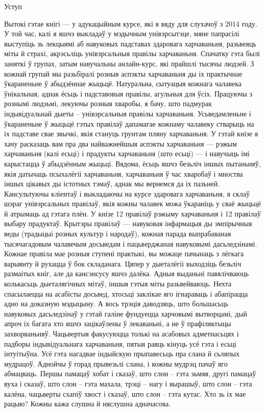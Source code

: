 Уступ

Вытокі гэтае кнігі — у адукацыйным курсе, які я вяду для слухачоў з 2014 году. У той час, калі я яшчэ выкладаў у мэдычным унівэрсытэце, мяне папрасілі выступіць зь лекцыямі аб навуковых падставах здаровага харчаваньня, разьвеяць міты й страхі, акрэсьліць унівэрсальныя правілы харчаваньня. Спачатку гэта былі заняткі ў групах, затым навучальны анлайн-курс, які прайшлі тысячы людзей. З кожнай групай мы разьбіралі розныя аспэкты харчаваньня ды іх практычнае ўкараненьне ў абыдзённае жыцьцё. Натуральна, сытуацыя кожнага чалавека ўнікальная, аднак ёсьць і падставовыя правілы, агульныя для ўсіх. 
Працуючы з рознымі людзьмі, лекуючы розныя хваробы, я бачу, што падмурак індывідуальнай дыеты – унівэрсальныя правілы харчаваньня. Усьведамленьне і ўкараненьне ў жыцьцё гэтых правілаў дапамагае кожнаму чалавеку стварыць на іх падставе свае звычкі, якія стануць грунтам пляну харчаваньня.
У гэтай кнізе я хачу расказаць вам пра два найважнейшыя аспэкты харчаваньня — рэжым харчаваньня (калі есьці) і прадукты харчаваньня (што есьці) — і навучыць імі карыстацца ў абыдзённым жыцьці. Вядома, ёсьць яшчэ безьліч іншых пытаньняў, якія датычаць псыхалёгіі харчаваньня, харчаваньня ў час хваробаў і мноства іншых цікавых ды істотных тэмаў, аднак мы вернемся да іх пазьней. Кансультуючы кліентаў і выкладаючы на курсе здаровага харчаваньня, я склаў шэраг унівэрсальных правілаў, якія кожны чалавек можа ўкараніць у сваё жыцьцё й атрымаць ад гэтага плён. У кнізе 12 правілаў рэжыму харчаваньня і 12 правілаў выбару прадуктаў. Крытэры правілаў — навуковая інфармацыя ды эмпірычныя веды (традыцыі розных культур і народаў), кожная парада выпрабаваная тысячагадовым чалавечым досьведам і пацьверджаная навуковымі дасьледзінамі. Кожнае правіла мае розныя ступені практыкі, вы можаце пачынаць з лёгкага варыянту й рухацца ў бок складанага.
Цяпер у дыеталёгіі выходзіць безьліч размаітых кніг, але да кансэнсусу яшчэ далёка. Адныя выданьні павялічваюць колькасьць дыеталягічных мітаў, іншыя гэтыя міты разьвейваюць. Нехта спасылаецца на асабісты досьвед, хтосьці заклікае яго ігнараваць і абапірацца адно на доказную мэдыцыну. А вось трэція даводзяць, што большасьць навуковых дасьледзінаў у гэтай галіне фундуецца харчовымі вытворцамі, дый апроч іх багата хто яшчэ зацікаўлены ў лекаваньні, а не ў прафіляктыцы захворваньняў. Чацьвертыя факусуюцца толькі на асабовых адметнасьцях і падборы індывідуальнага харчаваньня, пятыя раяць кінуць усё гэта і есьці інтуітыўна.
Усё гэта нагадвае індыйскую прыпавесьць пра слана й сьляпых мудрацоў. Аднойчы ў горад прывезьлі слана, і кожны мудрэц пачаў яго абмацваць. Першы памацаў хобат і сказаў, што слон – гэта зьмяя, другі памацаў вуха і сказаў, што слон – гэта махала, трэці – нагу і вырашыў, што слон – гэта калёна, чацьверты схапіў хвост і сказаў, што слон – гэта кутас. Хто зь іх мае рацыю? Кожны кажа слушна й няслушна адначасова.
